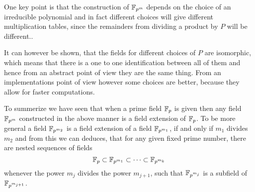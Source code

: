 One key point is that the construction of $\mathbb{F}_{p^m}$ depends on the choice of an irreducible polynomial and in fact different choices will give different multiplication tables, since the remainders from dividing a product by $P$ will be different..

It can however be shown, that the fields for different choices of $P$ are isomorphic, which means that there is a one to one identification between all of them and hence from an abstract point of view they are the same thing. From an implementations point of view however some choices are better, because they allow for faster computations.

To summerize we have seen that when a prime field $\mathbb{F}_p$ is given then any field 
$\mathbb{F}_{p^m}$ constructed in the above manner is a field extension of $\mathbb{F}_p$. To be more general a field $\mathbb{F}_{p^{m_2}}$ is a field extension of a field $\mathbb{F}_{p^{m_1}}$, if and only if $m_1$ divides $m_2$ and from this we can deduces, that for any given fixed prime number, there are nested sequences of fields
\begin{equation}
\mathbb{F}_p \subset \mathbb{F}_{p^{m_1}} \subset \cdots \subset \mathbb{F}_{p^{m_k}}
\end{equation}
whenever the power $m_j$ divides the power $m_{j+1}$, such that $\mathbb{F}_{p^{m_j}}$ is a subfield of $\mathbb{F}_{p^{m_{j+1}}}$.

